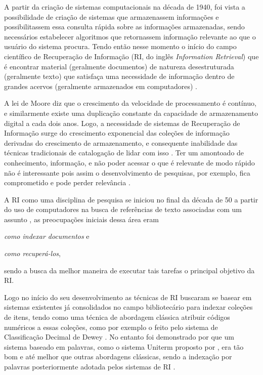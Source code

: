     
    
    A partir da criação de sistemas computacionais na década de 1940, foi vista a possibilidade de criação de sistemas que armazenassem informações e possibilitassem essa consulta rápida sobre as informações armazenadas, sendo necessários estabelecer algoritmos que retornassem informação relevante ao que o usuário do sistema procura. 
    Tendo então nesse momento o início do campo científico de Recuperação de Informação (RI, do inglês \textit{Information Retrieval}) que é encontrar material (geralmente documentos) de natureza desestruturada (geralmente texto) que satisfaça uma necessidade de informação dentro de grandes acervos (geralmente armazenados em computadores) \cite[p.~1]{Manning2008IIR}.
    
    A lei de Moore diz que o crescimento da velocidade de processamento é contínuo, e similarmente existe uma duplicação constante da capacidade de armazenamento digital a cada dois anos. %
    Logo, a necessidade de sistemas de Recuperação de Informação surge do crescimento exponencial das coleções de informação derivadas do crescimento de armazenamento, e consequente inabilidade das técnicas tradicionais de catalogação de lidar com isso \cite{Sanderson2012THIRR}.
    Ter um amontoado de conhecimento, informação, e não poder acessar o que é relevante de modo rápido não é interessante pois assim o desenvolvimento de pesquisas, por exemplo, fica comprometido e pode perder relevância \cite{Bush:1979:WMT:1113634.1113638}.
    
    A RI como uma disciplina de pesquisa se iniciou no final da década de 50 a partir do uso de computadores na busca de referências de texto associadas com um assunto \cite[p.~3]{Sanderson2012THIRR}, as preocupações iniciais dessa área eram 
    \begin{enumerate*}[label=(\alph*)]
    \item \textit{como indexar documentos} e \item \textit{como recuperá-los},
    \end{enumerate*}
    sendo a busca da melhor maneira de executar tais tarefas o principal objetivo da RI.
    
    Logo no início do seu desenvolvimento as técnicas de RI buscaram se basear em sistemas existentes já consolidados no campo bibliotecário para indexar coleções de itens, tendo como uma técnica de abordagem clássica atribuir códigos numéricos a essas coleções, como por exemplo o feito pelo sistema de Classificação Decimal de Dewey \cite[p.~1446]{Sanderson2012THIRR}.
    No entanto foi demonstrado por  que um sistema baseado em palavras, como o sistema Uniterm proposto por , era tão bom e até melhor que outras abordagens clássicas, sendo a indexação por palavras posteriormente adotada pelos sistemas de RI \cite[p.~1446]{Sanderson2012THIRR}.
    
